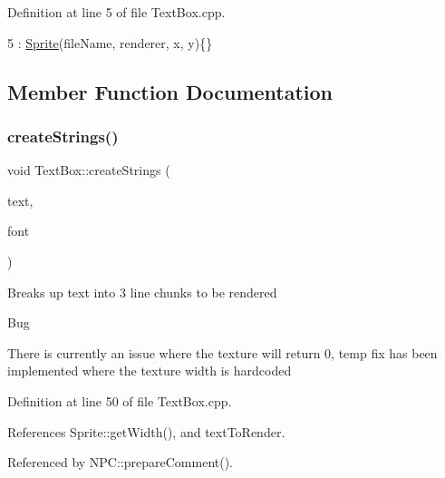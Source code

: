 Definition at line 5 of file Text\+Box.\+cpp.


\begin{DoxyCode}
5 : \hyperlink{class_sprite_a12cba3ac1868418add3c4d95ce87e615}{Sprite}(fileName, renderer, x, y)\{\}
\end{DoxyCode}


\subsection{Member Function Documentation}
\mbox{\label{class_text_box_a19cb5e85c864060ecdb2fe2bab6fd54d}} 
\subsubsection{\texorpdfstring{create\+Strings()}{createStrings()}}
{\footnotesize\ttfamily void Text\+Box\+::create\+Strings (\begin{DoxyParamCaption}\item[{std\+::string}]{text,  }\item[{T\+T\+F\+\_\+\+Font $\ast$}]{font }\end{DoxyParamCaption})}

Breaks up text into 3 line chunks to be rendered \begin{DoxyRefDesc}{Bug}
\item[\hyperlink{bug__bug000001}{Bug}]There is currently an issue where the texture will return 0, temp fix has been implemented where the texture width is hardcoded \end{DoxyRefDesc}


Definition at line 50 of file Text\+Box.\+cpp.



References Sprite\+::get\+Width(), and text\+To\+Render.



Referenced by N\+P\+C\+::prepare\+Comment().


